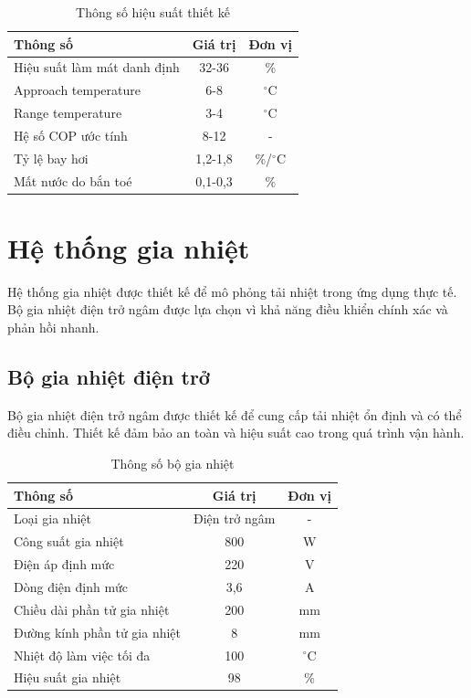 \documentclass[../main.tex]{subfiles}
\begin{document}
\begin{table}[H]
\centering
\renewcommand{\arraystretch}{1.1}
\caption{Thông số hiệu suất thiết kế}
\label{tab:performance_specs}
\begin{tabular}{|l|c|c|}
\hline
\textbf{Thông số} & \textbf{Giá trị} & \textbf{Đơn vị} \\
\hline
Hiệu suất làm mát danh định & 32-36 & \% \\
\hline
Approach temperature & 6-8 & $^\circ\mathrm{C}$ \\
\hline
Range temperature & 3-4 & $^\circ\mathrm{C}$ \\
\hline
Hệ số COP ước tính & 8-12 & - \\
\hline
Tỷ lệ bay hơi & 1,2-1,8 & \%/$^\circ\mathrm{C}$ \\
\hline
Mất nước do bắn toé & 0,1-0,3 & \% \\
\hline
\end{tabular}
\end{table}

\section{Hệ thống gia nhiệt}
\label{sec:heating_system}

Hệ thống gia nhiệt được thiết kế để mô phỏng tải nhiệt trong ứng dụng thực tế. Bộ gia nhiệt điện trở ngâm được lựa chọn vì khả năng điều khiển chính xác và phản hồi nhanh.

\subsection{Bộ gia nhiệt điện trở}
\label{sec:electric_heater}

Bộ gia nhiệt điện trở ngâm được thiết kế để cung cấp tải nhiệt ổn định và có thể điều chỉnh. Thiết kế đảm bảo an toàn và hiệu suất cao trong quá trình vận hành.

\begin{table}[H]
\centering
\renewcommand{\arraystretch}{1.1}
\caption{Thông số bộ gia nhiệt}
\label{tab:heater_specs}
\begin{tabular}{|l|c|c|}
\hline
\textbf{Thông số} & \textbf{Giá trị} & \textbf{Đơn vị} \\
\hline
Loại gia nhiệt & Điện trở ngâm & - \\
\hline
Công suất gia nhiệt & 800 & W \\
\hline
Điện áp định mức & 220 & V \\
\hline
Dòng điện định mức & 3,6 & A \\
\hline
Chiều dài phần tử gia nhiệt & 200 & mm \\
\hline
Đường kính phần tử gia nhiệt & 8 & mm \\
\hline
Nhiệt độ làm việc tối đa & 100 & $^\circ\mathrm{C}$ \\
\hline
Hiệu suất gia nhiệt & 98 & \% \\
\hline
\end{tabular}
\end{table}
\end{document}
